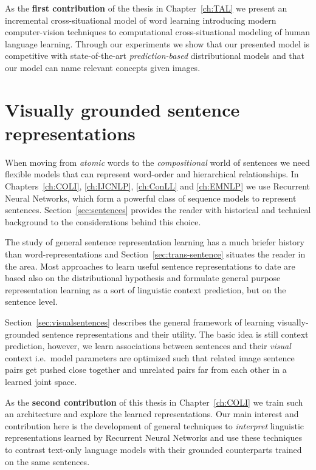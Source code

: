 As the \textbf{first contribution} of the thesis in Chapter~\ref{ch:TAL} we present an
incremental cross-situational model of word learning introducing modern computer-vision
techniques to computational cross-situational modeling of  human language learning.
Through our experiments we show that our presented model is competitive with state-of-the-art
\emph{prediction-based} distributional models and that our model can name
relevant concepts given images.

\section{Visually grounded sentence representations}

When moving from \emph{atomic} words to the \emph{compositional} world of sentences we need flexible
models that can represent word-order and hierarchical relationships.  In Chapters~\ref{ch:COLI}, \ref{ch:IJCNLP},  \ref{ch:ConLL} and \ref{ch:EMNLP}
we use Recurrent Neural Networks, which form a powerful class of  sequence models to represent sentences.
Section~\ref{sec:sentences} provides the reader with
historical and technical background to the considerations behind this choice.

The study of general sentence representation learning has a much briefer history than word-representations
and Section~\ref{sec:trans-sentence} situates the reader in the area. 
Most approaches to learn useful sentence representations to date are
based also on the distributional hypothesis and formulate general purpose representation learning as a sort of
linguistic context prediction, but on the sentence level.

Section~\ref{sec:visualsentences} describes the general framework of learning
visually-grounded sentence representations and their utility.
The basic idea is still context prediction, however, we learn associations between
sentences and their \emph{visual} context i.e.\ model parameters are optimized such
that related image sentence pairs get pushed close together and unrelated pairs far
from each other in a learned joint space.

As the \textbf{second contribution} of this thesis in Chapter~\ref{ch:COLI}
we train such an architecture and explore the learned representations.
Our main interest and contribution here is the development of general techniques to
\emph{interpret} linguistic representations learned by
Recurrent Neural Networks and use these techniques to contrast text-only language
models with their grounded counterparts trained on the same sentences.

